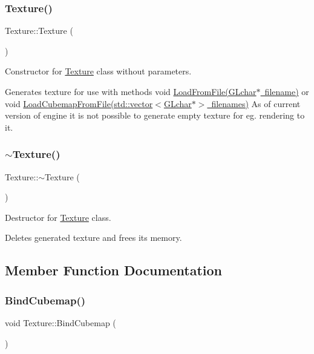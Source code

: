 \subsubsection{\texorpdfstring{Texture()}{Texture()}}
{\footnotesize\ttfamily Texture\+::\+Texture (\begin{DoxyParamCaption}{ }\end{DoxyParamCaption})}



Constructor for \mbox{\hyperlink{class_texture}{Texture}} class without parameters. 

Generates texture for use with methods void \mbox{\hyperlink{class_texture_a26134f37b4a22ff895686533937ba218}{Load\+From\+File(\+G\+Lchar$\ast$ filename)}} or void \mbox{\hyperlink{class_texture_a056053b6bb3b6ed3bb44a624f0fb62c7}{Load\+Cubemap\+From\+File(std\+::vector$<$\+G\+Lchar$\ast$$>$ filenames)}} As of current version of engine it is not possible to generate empty texture for eg. rendering to it. \mbox{\label{class_texture_a09c4bcb7462f64c1d20fa69dba3cee8a}} 
\subsubsection{\texorpdfstring{$\sim$Texture()}{~Texture()}}
{\footnotesize\ttfamily Texture\+::$\sim$\+Texture (\begin{DoxyParamCaption}{ }\end{DoxyParamCaption})}



Destructor for \mbox{\hyperlink{class_texture}{Texture}} class. 

Deletes generated texture and frees it\textquotesingle{}s memory. 

\subsection{Member Function Documentation}
\mbox{\label{class_texture_a34a98124de12bc104a81663322b2d1d9}} 
\subsubsection{\texorpdfstring{BindCubemap()}{BindCubemap()}}
{\footnotesize\ttfamily void Texture\+::\+Bind\+Cubemap (\begin{DoxyParamCaption}{ }\end{DoxyParamCaption})}

